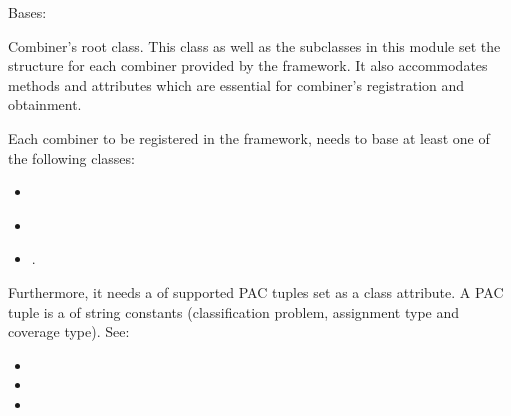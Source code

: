\documentclass[letterpaper,10pt,english]{sphinxmanual}
\begin{document}
\begin{fulllineitems}
\label{\detokenize{pusion.core.combiner:pusion.core.combiner.Combiner}}
\sphinxAtStartPar
Bases: 

\sphinxAtStartPar
Combiner’s root class. This class as well as the subclasses in this module set the structure for each combiner
provided by the framework. It also accommodates methods and attributes which are essential for combiner’s
registration and obtainment.

\sphinxAtStartPar
Each combiner to be registered in the framework, needs to base at least one of the following classes:
\begin{itemize}
\item {} 
\sphinxAtStartPar
{\hyperref[\detokenize{pusion.core.combiner:pusion.core.combiner.UtilityBasedCombiner}]{}}

\item {} 
\sphinxAtStartPar
{\hyperref[\detokenize{pusion.core.combiner:pusion.core.combiner.TrainableCombiner}]{}}

\item {} 
\sphinxAtStartPar
{\hyperref[\detokenize{pusion.core.combiner:pusion.core.combiner.EvidenceBasedCombiner}]{}}.

\end{itemize}

\sphinxAtStartPar
Furthermore, it needs a   of supported PAC tuples set as a class attribute.
A PAC tuple is a  of string constants (classification problem, assignment type and coverage type). See:
\begin{itemize}
\item {} 
\sphinxAtStartPar
{}

\item {} 
\sphinxAtStartPar
{}

\item {} 
\sphinxAtStartPar
{}

\end{itemize}


\end{fulllineitems}
\end{document}
